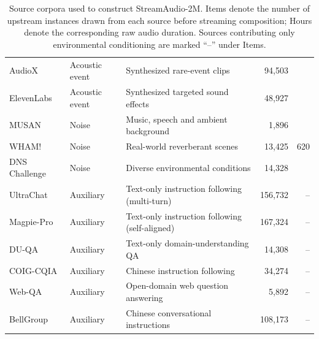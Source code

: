 \documentclass{llmxive}
\begin{document}
\begin{table}[!htbp]
\begin{tabularx}{\linewidth}{@{}l l X r r@{}}
AudioX                & Acoustic event & Synthesized rare-event clips                      & 94{,}503  &     \\
ElevenLabs            & Acoustic event & Synthesized targeted sound effects                & 48{,}927  &     \\
\midrule
MUSAN                 & Noise          & Music, speech and ambient background              & 1{,}896   & \multirow{3}{*}{620} \\
WHAM!                 & Noise          & Real-world reverberant scenes                     & 13{,}425  &     \\
DNS Challenge         & Noise          & Diverse environmental conditions                  & 14{,}328  &     \\
\midrule
UltraChat             & Auxiliary      & Text-only instruction following (multi-turn)      & 156{,}732 & --  \\
Magpie-Pro            & Auxiliary      & Text-only instruction following (self-aligned)    & 167{,}324 & --  \\
DU-QA                 & Auxiliary      & Text-only domain-understanding QA                 & 14{,}308  & --  \\
COIG-CQIA             & Auxiliary      & Chinese instruction following                     & 34{,}274  & --  \\
Web-QA                & Auxiliary      & Open-domain web question answering                & 5{,}892   & --  \\
BellGroup             & Auxiliary      & Chinese conversational instructions               & 108{,}173 & --  \\
\bottomrule
\end{tabularx}
\caption{Source corpora used to construct StreamAudio-2M. Items denote the number of
upstream instances drawn from each source before streaming composition; Hours denote the
corresponding raw audio duration. Sources contributing only environmental conditioning
are marked ``--'' under Items.}
\label{tab:app:sources}
\end{table}
\end{document}
